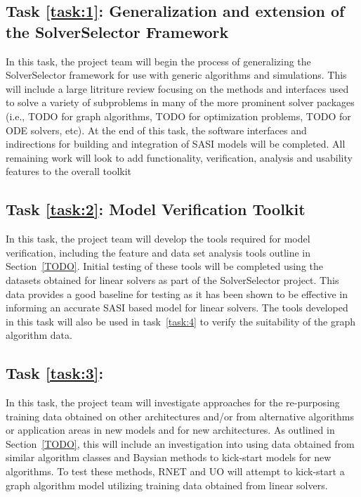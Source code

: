 \subsection{Task \ref{task:1}: Generalization and extension of the SolverSelector Framework}
In this task, the project team will begin the process of generalizing the SolverSelector framework for 
use with generic algorithms and simulations. This will include a large litriture review focusing on the methods 
and interfaces used to solve a variety of subproblems in many of the more prominent solver packages (i.e., TODO for 
graph algorithms, TODO for optimization problems, TODO for ODE solvers, etc). At the end of this task, the software interfaces
and indirections for building and integration of SASI models will be completed. All remaining work will look to add functionality, verification, analysis and usability features to the overall toolkit


\label{task:2}
\subsection{Task \ref{task:2}: Model Verification Toolkit }
In this task, the project team will develop the tools required for model verification, including the feature and data set analysis tools outline in Section~\ref{TODO}. Initial testing of these tools will be completed using the datasets obtained for linear solvers as part of the SolverSelector 
project. This data provides a good baseline for testing as it has been shown to be effective in informing an accurate SASI based model for linear solvers. The tools developed in this task will also be used in task~\ref{task:4} to verify the suitability of the graph algorithm data. 


\label{task:3}
\subsection{Task \ref{task:3}: }
In this task, the project team will investigate approaches for the re-purposing training data obtained on other architectures and/or from alternative algorithms or application areas in new models and for new architectures. As outlined in Section~\ref{TODO}, this will include an investigation into using data obtained from similar algorithm classes and Baysian methods to kick-start models for new algorithms. To test these methods, RNET and UO will attempt to kick-start a graph algorithm model utilizing training data obtained from linear solvers. 

